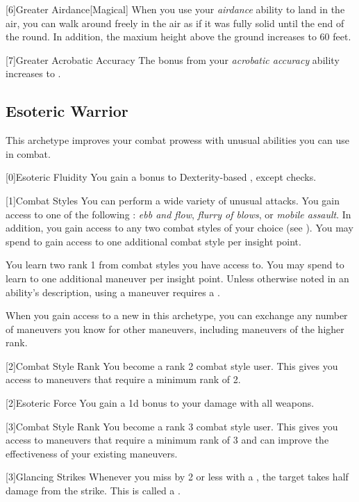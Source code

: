        [6]{Greater Airdance}[Magical] When you use your \textit{airdance} ability to land in the air, you can walk around freely in the air as if it was fully solid until the end of the round.
        In addition, the maxium height above the ground increases to 60 feet.

        [7]{Greater Acrobatic Accuracy} The bonus from your \textit{acrobatic accuracy} ability increases to .

    \newpage
    \subsection{Esoteric Warrior}\label{Esoteric Warrior}
        This archetype improves your combat prowess with unusual abilities you can use in combat.

        [0]{Esoteric Fluidity} You gain a  bonus to Dexterity-based , except  checks.

        {
            [1]{Combat Styles}
            You can perform a wide variety of unusual attacks.
            You gain access to one of the following : \textit{ebb and flow}, \textit{flurry of blows}, or \textit{mobile assault}.
            In addition, you gain access to any two combat styles of your choice (see ).
            You may spend  to gain access to one additional combat style per insight point.

            You learn two rank 1  from combat styles you have access to.
            You may spend  to learn to one additional maneuver per insight point.
            Unless otherwise noted in an ability's description, using a maneuver requires a .

            When you gain access to a new  in this archetype,
                you can exchange any number of maneuvers you know for other maneuvers,
                including maneuvers of the higher rank.
        }

        {
            [2]{Combat Style Rank} You become a rank 2 combat style user.
            This gives you access to maneuvers that require a minimum rank of 2.

            [2]{Esoteric Force} You gain a \plus1d bonus to your damage with all weapons.
        }

        {
            [3]{Combat Style Rank} You become a rank 3 combat style user.
            This gives you access to maneuvers that require a minimum rank of 3 and can improve the effectiveness of your existing maneuvers.

            [3]{Glancing Strikes} Whenever you miss by 2 or less with a , the target takes half damage from the strike.
            This is called a .
        }


